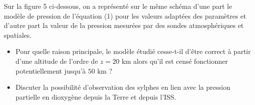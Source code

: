Sur la figure 5 ci-dessous, on a représenté sur le même schéma d'une part le modèle de pression de l'équation (1) pour les valeurs adaptées des paramètres et d'autre part la valeur de la pression mesurées par des sondes atmosphériques et spatiales.


\begin{itemize}
    \item[11.] Pour quelle raison principale, le modèle étudié cesse-t-il d'être correct à partir d'une altitude de l'ordre de $z = 20\text{ km}$ alors qu'il est censé fonctionner potentiellement jusqu'à $50\text{ km}$ ?
    
    \item[12.] Discuter la possibilité d'observation des sylphes en lien avec la pression partielle en dioxygène depuis la Terre et depuis l'ISS.
\end{itemize}
